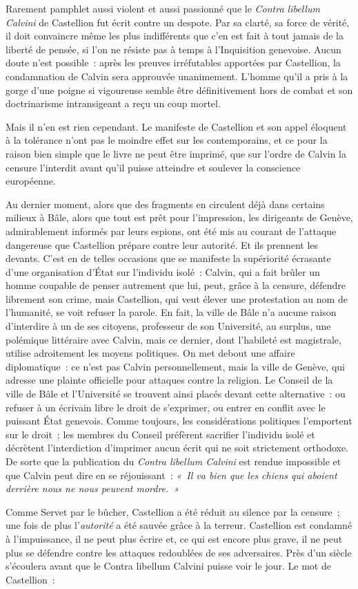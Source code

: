 \documentclass[french,twoside]{book} %
\newcommand\chaptercont{} %
\begin{document}
\chaptercont
\noindent Rarement pamphlet aussi violent et aussi passionné que le \emph{Contra libellum Calvini} de Castellion fut écrit contre un despote. Par sa clarté, sa force de vérité, il doit convaincre même les plus indifférents que c’en est fait à tout jamais de la liberté de pensée, si l’on ne résiste pas à temps à l’Inquisition genevoise. Aucun doute n’est possible : après les preuves irréfutables apportées par Castellion, la condamnation de Calvin sera approuvée unanimement. L’homme qu’il a pris à la gorge d’une poigne si vigoureuse semble être définitivement hors de combat et son doctrinarisme intransigeant a reçu un coup mortel.\par
Mais il n’en est rien cependant. Le manifeste de Castellion et son appel éloquent à la tolérance n’ont pas le moindre effet sur les contemporains, et ce pour la raison bien simple que le livre ne peut être imprimé, que sur l’ordre de Calvin la censure l’interdit avant qu’il puisse atteindre et soulever la conscience européenne.\par
Au dernier moment, alors que des fragments en circulent déjà dans certains milieux à Bâle, alors que tout est prêt pour l’impression, les dirigeants de Genève, admirablement informés par leurs espions, ont été mis au courant de l’attaque dangereuse que Castellion prépare contre leur autorité. Et ils prennent les devants. C’est en de telles occasions que se manifeste la supériorité écrasante d’une organisation d’État sur l’individu isolé : Calvin, qui a fait brûler un homme coupable de penser autrement que lui, peut, grâce à la censure, défendre librement son crime, mais Castellion, qui veut élever une protestation au nom de l’humanité, se voit refuser la parole. En fait, la ville de Bâle n’a aucune raison d’interdire à un de ses citoyens, professeur de son Université, au surplus, une polémique littéraire avec Calvin, mais ce dernier, dont l’habileté est magistrale, utilise adroitement les moyens politiques. On met debout une affaire diplomatique : ce n’est pas Calvin personnellement, mais la ville de Genève, qui adresse une plainte officielle pour attaques contre la religion. Le Conseil de la ville de Bâle et l’Université se trouvent ainsi placés devant cette alternative : ou refuser à un écrivain libre le droit de s’exprimer, ou entrer en conflit avec le puissant État genevois. Comme toujours, les considérations politiques l’emportent sur le droit ; les membres du Conseil préfèrent sacrifier l’individu isolé et décrètent l’interdiction d’imprimer aucun écrit qui ne soit strictement orthodoxe. De sorte que la publication du \emph{Contra libellum Calvini} est rendue impossible et que Calvin peut dire en se réjouissant : \emph{« Il va bien que les chiens qui aboient derrière nous ne nous peuvent mordre. »}\par
Comme Servet par le bûcher, Castellion a été réduit au silence par la censure ; une fois de plus l’\emph{autorité} a été sauvée grâce à la terreur. Castellion est condamné à l’impuissance, il ne peut plus écrire et, ce qui est encore plus grave, il ne peut plus se défendre contre les attaques redoublées de ses adversaires. Près d’un siècle s’écoulera avant que le Contra libellum Calvini puisse voir le jour. Le mot de Castellion :\par
\end{document}
